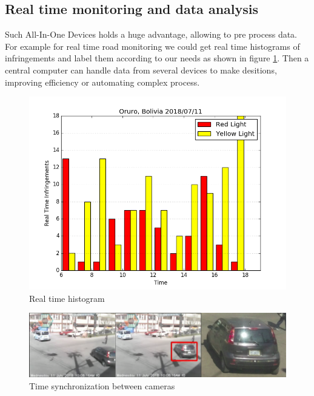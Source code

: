 \documentclass[fleqn,12pt]{SelfArx} %
\begin{document}
\subsection{Real time monitoring and data analysis}

Such All-In-One Devices holds a huge advantage, allowing to pre process data. For example for real time road monitoring we could get real time histograms of infringements and label them according to our needs as shown in figure \ref{fig:histogram}. Then a central computer can handle data from several devices to make desitions, improving efficiency or automating complex process.

\begin{figure}[ht]\centering
	\includegraphics[width=\linewidth]{images/histogram}
	\caption{Real time histogram}
	\label{fig:histogram}
\end{figure}

\begin{figure}[ht]\centering %
\includegraphics[width=\linewidth]{images/sync}
\caption{Time synchronization between cameras}
\label{fig:sync}
\end{figure}
\end{document}
